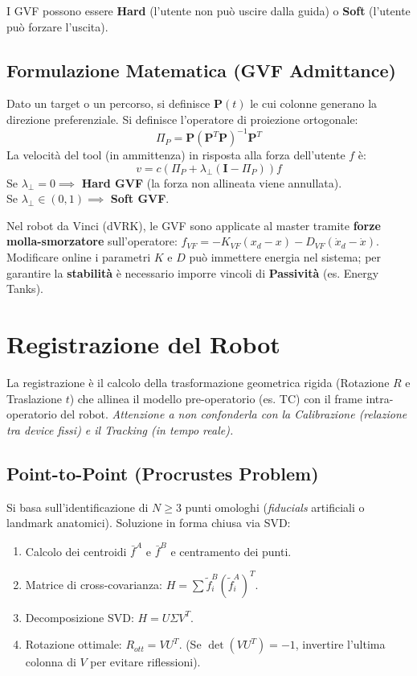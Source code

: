 \documentclass[11pt,a4paper,twoside]{report}
\begin{document}
I GVF possono essere \textbf{Hard} (l'utente non può uscire dalla guida) o \textbf{Soft} (l'utente può forzare l'uscita).

\section{Formulazione Matematica (GVF Admittance)}
Dato un target o un percorso, si definisce $\mathbf{P}(t)$ le cui colonne generano la direzione preferenziale. Si definisce l'operatore di proiezione ortogonale:
\begin{equation}
    \Pi_P = \mathbf{P}(\mathbf{P}^T \mathbf{P})^{-1}\mathbf{P}^T
\end{equation}
La velocità del tool (in ammittenza) in risposta alla forza dell'utente $f$ è:
\begin{equation}
    v = c \left( \Pi_P + \lambda_\perp (\mathbf{I} - \Pi_P) \right) f
\end{equation}
Se $\lambda_\perp = 0 \implies$ \textbf{Hard GVF} (la forza non allineata viene annullata). \\
Se $\lambda_\perp \in (0,1) \implies$ \textbf{Soft GVF}.

\begin{conceptbox}
    Nel robot da Vinci (dVRK), le GVF sono applicate al master tramite \textbf{forze molla-smorzatore} sull'operatore: $f_{VF} = -K_{VF}(x_d - x) - D_{VF}(\dot{x}_d - \dot{x})$. Modificare online i parametri $K$ e $D$ può immettere energia nel sistema; per garantire la \textbf{stabilità} è necessario imporre vincoli di \textbf{Passività} (es. Energy Tanks).
\end{conceptbox}


\chapter{Registrazione del Robot}
La registrazione è il calcolo della trasformazione geometrica rigida (Rotazione $R$ e Traslazione $t$) che allinea il modello pre-operatorio (es. TC) con il frame intra-operatorio del robot.
\textit{Attenzione a non confonderla con la Calibrazione (relazione tra device fissi) e il Tracking (in tempo reale).}

\section{Point-to-Point (Procrustes Problem)}
Si basa sull'identificazione di $N \ge 3$ punti omologhi (\textit{fiducials} artificiali o landmark anatomici). Soluzione in forma chiusa via SVD:
\begin{enumerate}
    \item Calcolo dei centroidi $\bar{f}^A$ e $\bar{f}^B$ e centramento dei punti.
    \item Matrice di cross-covarianza: $H = \sum \tilde{f}^B_i (\tilde{f}^A_i)^T$.
    \item Decomposizione SVD: $H = U \Sigma V^T$.
    \item Rotazione ottimale: $R_{ott} = V U^T$. (Se $\det(V U^T) = -1$, invertire l'ultima colonna di $V$ per evitare riflessioni).
\end{enumerate}
\end{document}
